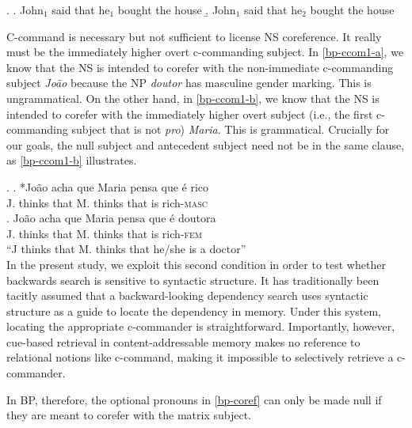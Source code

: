 \documentclass[12pt,letterpaper]{article}
\newcommand{\smallcaps}[1]{\textsc{\MakeLowercase{#1}}}
\newcommand{\spacesc}[1]{\textls[50]{\smallcaps{#1}}}
\newcommand{\runinhead}[1]{\vspace{12pt}\noindent\spacesc{#1}\hspace{0.5em}}
\begin{document}
\ex. \label{coreference} \a. John$_1$ said that he$_1$ bought the house \label{coreference-a}
     \b. John$_1$ said that he$_2$ bought the house \label{coreference-b}

\runinhead{The immediately higher overt subject} C-command is necessary but not sufficient to license NS coreference. It really must be the immediately higher overt c-commanding subject. In \ref{bp-ccom1-a}, we know that the NS is intended to corefer with the non-immediate c-commanding subject \emph{João} because the NP \emph{doutor} has masculine gender marking. This is ungrammatical. On the other hand, in \ref{bp-ccom1-b}, we know that the NS is intended to corefer with the immediately higher overt subject (i.e., the first c-commanding subject that is not \emph{pro}) \emph{Maria}. This is grammatical. Crucially for our goals, the null subject and antecedent subject need not be in the same clause, as \ref{bp-ccom1-b} illustrates.

\ex. \label{bp-ccom1} \ag. *João acha que Maria pensa que é rico \label{bp-ccom1-a} \\
          J. thinks that M. thinks that is rich-\textsc{masc}\\
     \bg. João acha que Maria pensa que é doutora\\
          J. thinks that M. thinks that is rich-\textsc{fem} \label{bp-ccom1-b}\\
          ``J thinks that M. thinks that he/she is a doctor''\\


In the present study, we exploit this second condition in order to test whether backwards search is sensitive to syntactic structure. It has traditionally been tacitly assumed that a backward-looking dependency search uses syntactic structure as a guide to locate the dependency in memory. Under this system, locating the appropriate c-commander is straightforward. Importantly, however, cue-based retrieval in content-addressable memory makes no reference to relational notions like c-command, making it impossible to selectively retrieve a c-commander.

In BP, therefore, the optional pronouns in \ref{bp-coref} can only be made null if they are meant to corefer with the matrix subject.
\end{document}
